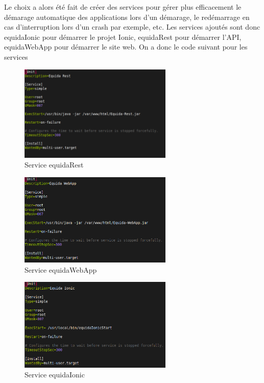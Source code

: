\documentclass[report]{BetterDocument}
\begin{document}
		Le choix a alors été fait de créer des services pour gérer plus efficacement le démarage automatique des applications lors d'un démarage, le redémarrage en cas d'interruption lors d'un crash par exemple, etc. Les services ajoutés sont donc equidaIonic pour démarrer le projet Ionic, equidaRest pour démarrer l'API, equidaWebApp pour démarrer le site web. On a donc le code suivant pour les services

		\begin{figure}[H]
			\centering\includegraphics[width=0.65\textwidth, keepaspectratio]{res/service-equidaRest.png}
			\caption{Service equidaRest}
		\end{figure}

		\begin{figure}[H]
			\centering\includegraphics[width=0.65\textwidth, keepaspectratio]{res/service-equidaWebApp.png}
			\caption{Service equidaWebApp}
		\end{figure}

		\begin{figure}[H]
			\centering\includegraphics[width=0.65\textwidth, keepaspectratio]{res/service-equidaIonic.png}
			\caption{Service equidaIonic}
		\end{figure}
\end{document}
